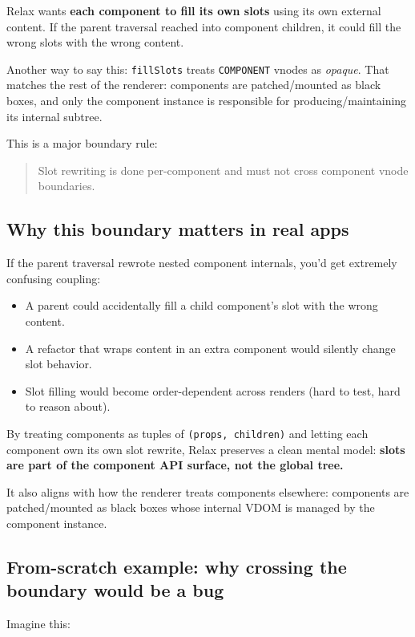 Relax wants \textbf{each component to fill its own slots} using its own external content.
If the parent traversal reached into component children, it could fill the wrong slots with the wrong content.

Another way to say this: \texttt{fillSlots} treats \texttt{COMPONENT} vnodes as \emph{opaque}. That matches the rest of the renderer: components are patched/mounted as black boxes, and only the component instance is responsible for producing/maintaining its internal subtree.

This is a major boundary rule:

\begin{quote}
Slot rewriting is done per-component and must not cross component vnode boundaries.
\end{quote}

\subsection{Why this boundary matters in real apps}

If the parent traversal rewrote nested component internals, you'd get extremely confusing coupling:

\begin{itemize}
  \item A parent could accidentally fill a child component's slot with the wrong content.
  \item A refactor that wraps content in an extra component would silently change slot behavior.
  \item Slot filling would become order-dependent across renders (hard to test, hard to reason about).
\end{itemize}

By treating components as tuples of \texttt{(props, children)} and letting each component own its own slot rewrite,
Relax preserves a clean mental model: \textbf{slots are part of the component API surface, not the global tree.}

It also aligns with how the renderer treats components elsewhere:
components are patched/mounted as black boxes whose internal VDOM is managed by the component instance.

\subsection{From-scratch example: why crossing the boundary would be a bug}

Imagine this:


